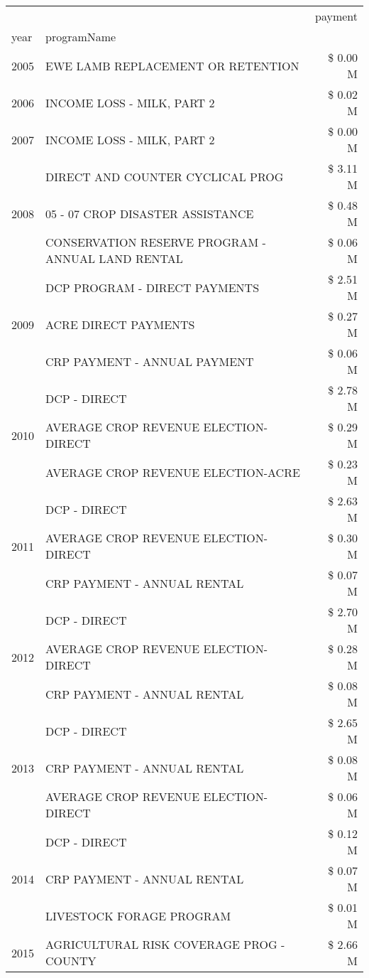 \begin{tabular}{llr}
\toprule
 &  & payment \\
year & programName &  \\
\midrule
2005 & EWE LAMB REPLACEMENT OR RETENTION & \$ 0.00 M \\
\cline{1-3}
2006 & INCOME LOSS - MILK, PART 2 & \$ 0.02 M \\
\cline{1-3}
2007 & INCOME LOSS - MILK, PART 2 & \$ 0.00 M \\
\cline{1-3}
\multirow[t]{3}{*}{2008} & DIRECT AND COUNTER CYCLICAL PROG & \$ 3.11 M \\
 & 05 - 07 CROP DISASTER ASSISTANCE & \$ 0.48 M \\
 & CONSERVATION RESERVE PROGRAM - ANNUAL LAND RENTAL & \$ 0.06 M \\
\cline{1-3}
\multirow[t]{3}{*}{2009} & DCP PROGRAM - DIRECT PAYMENTS & \$ 2.51 M \\
 & ACRE DIRECT PAYMENTS & \$ 0.27 M \\
 & CRP PAYMENT - ANNUAL PAYMENT & \$ 0.06 M \\
\cline{1-3}
\multirow[t]{3}{*}{2010} & DCP - DIRECT & \$ 2.78 M \\
 & AVERAGE CROP REVENUE ELECTION-DIRECT & \$ 0.29 M \\
 & AVERAGE CROP REVENUE ELECTION-ACRE & \$ 0.23 M \\
\cline{1-3}
\multirow[t]{3}{*}{2011} & DCP - DIRECT & \$ 2.63 M \\
 & AVERAGE CROP REVENUE ELECTION-DIRECT & \$ 0.30 M \\
 & CRP PAYMENT - ANNUAL RENTAL & \$ 0.07 M \\
\cline{1-3}
\multirow[t]{3}{*}{2012} & DCP - DIRECT & \$ 2.70 M \\
 & AVERAGE CROP REVENUE ELECTION-DIRECT & \$ 0.28 M \\
 & CRP PAYMENT - ANNUAL RENTAL & \$ 0.08 M \\
\cline{1-3}
\multirow[t]{3}{*}{2013} & DCP - DIRECT & \$ 2.65 M \\
 & CRP PAYMENT - ANNUAL RENTAL & \$ 0.08 M \\
 & AVERAGE CROP REVENUE ELECTION-DIRECT & \$ 0.06 M \\
\cline{1-3}
\multirow[t]{3}{*}{2014} & DCP - DIRECT & \$ 0.12 M \\
 & CRP PAYMENT - ANNUAL RENTAL & \$ 0.07 M \\
 & LIVESTOCK FORAGE PROGRAM & \$ 0.01 M \\
\cline{1-3}
\multirow[t]{3}{*}{2015} & AGRICULTURAL RISK COVERAGE PROG - COUNTY & \$ 2.66 M \\

\end{tabular}
